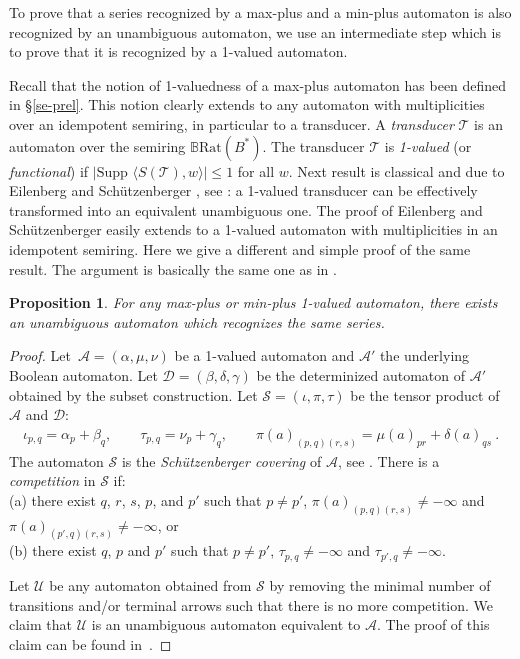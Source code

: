 \documentclass{article}
\newtheorem{prpstn}[thrm]{Proposition}
\newcommand{\supp}[1]{\text{Supp }#1}
\def\cA{{\mathcal A}}
\def\cU{{\mathcal U}}
\def\cT{{\mathcal T}}
\def\cD{{\mathcal D}}
\def\cS{{\mathcal S}}
\newcommand{\B} {\ensuremath{\mathbb{B}}}
\newcommand{\1}{\mathbb{1}}
\newcommand{\0}{\mathbb{0}}
\newcommand{\coef}[2]{\langle #1, #2\rangle}
\def\Rat{\text{Rat}}
\begin{document}
To prove that a series recognized by a max-plus and a min-plus
automaton is also recognized by an unambiguous 
automaton, we use an intermediate step which is to prove that it is
recognized by a 1-valued automaton. 

\medskip

Recall that the notion of 1-valuedness of a max-plus automaton has
been defined in \S \ref{se-prel}. 
This notion clearly extends to any automaton with multiplicities over
an idempotent semiring, in particular to a transducer. 
A {\em transducer} $\cT$ is an automaton over the semiring
$\B\Rat(B^*)$. 
The transducer $\cT$ is {\em 1-valued} (or {\em functional}) if 
$|\supp \coef{S(\cT)}{w}| \leq 1$ for all $w$. 
Next result is classical and due to Eilenberg \cite{eile} and
Sch\"utzenberger \cite{schu76}, see \cite[Chapter IV.4]{bers79}: 
a 1-valued transducer can be effectively transformed into an
equivalent unambiguous one. 
The proof of Eilenberg and Sch\"utzenberger easily extends 
to a 1-valued automaton with multiplicities in an idempotent
semiring. 
Here we give a different and simple proof of the same result. 
The argument is basically the same one as in
\cite[Section 4]{KLMP04}.  

\begin{prpstn}\label{pr-weber}
For any max-plus or min-plus 1-valued automaton, there exists 
an unambiguous automaton which recognizes the same series.
\end{prpstn}

\begin{proof}
Let~$\cA=(\alpha,\mu,\nu)$ be a 1-valued automaton and $\cA'$ the underlying
Boolean automaton.
 Let $\cD=(\beta,\delta,\gamma)$ be the determinized automaton of
 $\cA'$ obtained by the subset construction. Let
 $\cS=(\iota,\pi,\tau)$ be the tensor product of $\cA$ and $\cD$:
\begin{gather*}
\iota_{p,q}=\alpha_p + \beta_q, \qquad \tau_{p,q}= \nu_p + \gamma_q,
\qquad \pi(a)_{(p,q)(r,s)} = \mu(a)_{pr} + \delta(a)_{qs} \:.
\end{gather*} 
The automaton $\cS$ is the {\em Sch\"{u}tzenberger covering} of $\cA$,
see \cite{saka98}. 
There is a {\it competition} in $\cS$ if:
\\(a) there exist  $q$, $r$, $s$, $p$, and $p'$ such that $p\neq p'$, 
  $\pi(a)_{(p,q)(r,s)}\neq-\infty$ and $\pi(a)_{(p',q)(r,s)}\neq-\infty$, or
\\(b) there exist $q$, $p$ and $p'$ such that $p\neq p'$,
  $\tau_{p,q}\neq-\infty$ and $\tau_{p',q}\neq-\infty$.

Let $\cU$ be  any automaton obtained from $\cS$ by
removing the minimal number of transitions and/or terminal arrows such
that there is no more competition. 
We claim that $\cU$ is an unambiguous automaton equivalent to $\cA$.
The proof of this claim
can be found in~\cite[Section 4]{KLMP04}.
\end{proof}
\end{document}
